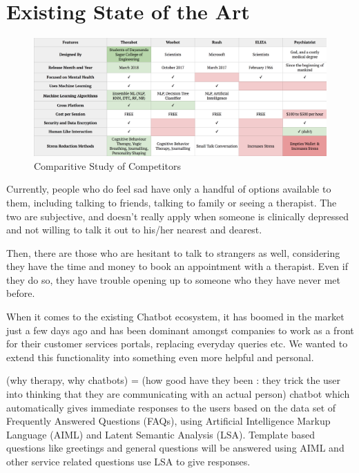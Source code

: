 \section{Existing State of the Art}

\begin{figure}[H]
    \centering
    \includegraphics[width=\linewidth]{images/comparitive-study-of-competitors.png}
    \caption{Comparitive Study of Competitors}
    \label{fig:comparitive-study-of-competitors}
\end{figure}

Currently, people who do feel sad have only a handful of options available to them, including talking to friends, talking to family or seeing a therapist. The two are subjective, and doesn’t really apply when someone is clinically depressed and not willing to talk it out to his/her nearest and dearest.

Then, there are those who are hesitant to talk to strangers as well, considering they have the time and money to book an appointment with a therapist. Even if they do so, they have trouble opening up to someone who they have never met before.

When it comes to the existing Chatbot ecosystem, it has boomed in the market just a few days ago and has been dominant amongst companies to work as a front for their customer services portals, replacing everyday queries etc. We wanted to extend this functionality into something even more helpful and personal.

(why therapy, why chatbots) = (how good have they been : they trick the user into thinking that they are communicating with an actual person) chatbot which automatically gives immediate responses to the users based on the data set of Frequently Answered Questions (FAQs), using Artificial Intelligence Markup Language (AIML) and Latent Semantic Analysis (LSA). Template based questions like greetings and general questions will be answered using AIML and other service related questions use LSA to give responses.

